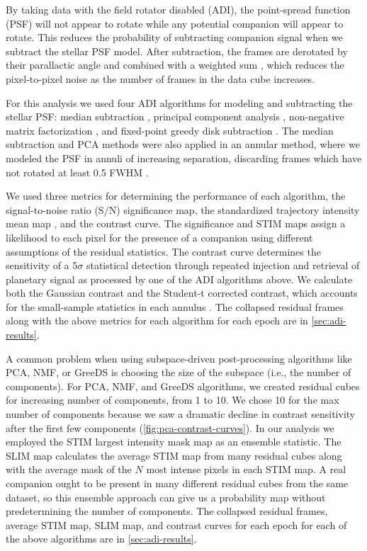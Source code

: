 \documentclass[twocolumn]{aastex631}
\begin{document}
By taking data with the field rotator disabled (ADI), the point-spread function (PSF) will not appear to rotate while any potential companion will appear to rotate. This reduces the probability of subtracting companion signal when we subtract the stellar PSF model. After subtraction, the frames are derotated by their parallactic angle and combined with a weighted sum \citep{bottom_noise-weighted_2017}, which reduces the pixel-to-pixel noise as the number of frames in the data cube increases.

For this analysis we used four ADI algorithms for modeling and subtracting the stellar PSF: median subtraction \citep{marois_angular_2006}, principal component analysis \citep[PCA, also referred to as KLIP;][]{soummer_detection_2012}, non-negative matrix factorization \citep[NMF;][]{ren_non-negative_2018}, and fixed-point greedy disk subtraction \citep[GreeDS;][]{pairet_reference-less_2019,pairet_mayonnaise_2020}. The median subtraction and PCA methods were also applied in an annular method, where we modeled the PSF in annuli of increasing separation, discarding frames which have not rotated at least 0.5 FWHM \citep{marois_angular_2006}.

We used three metrics for determining the performance of each algorithm, the signal-to-noise ratio (S/N) significance map, the standardized trajectory intensity mean map \citep[STIM map;][]{pairet_stim_2019}, and the contrast curve. The significance and STIM maps assign a likelihood to each pixel for the presence of a companion using different assumptions of the residual statistics. The contrast curve determines the sensitivity of a 5$\sigma$ statistical detection through repeated injection and retrieval of planetary signal as processed by one of the ADI algorithms above. We calculate both the Gaussian contrast and the Student-t corrected contrast, which accounts for the small-sample statistics in each annulus \citep{mawet_fundamental_2014}. The collapsed residual frames along with the above metrics for each algorithm for each epoch are in \autoref{sec:adi-results}.

A common problem when using subspace-driven post-processing algorithms like PCA, NMF, or GreeDS is choosing the size of the subspace (i.e., the number of components). For PCA, NMF, and GreeDS algorithms, we created residual cubes for increasing number of components, from 1 to 10. We chose 10 for the max number of components because we saw a dramatic decline in contrast sensitivity after the first few components (\autoref{fig:pca-contrast-curves}). In our analysis we employed the STIM largest intensity mask map \citep[SLIM map;][]{pairet_signal_2020} as an ensemble statistic. The SLIM map calculates the average STIM map from many residual cubes along with the average mask of the $N$ most intense pixels in each STIM map. A real companion ought to be present in many different residual cubes from the same dataset, so this ensemble approach can give us a probability map without predetermining the number of components. The collapsed residual frames, average STIM map, SLIM map, and contrast curves for each epoch for each of the above algorithms are in \autoref{sec:adi-results}.
\end{document}
